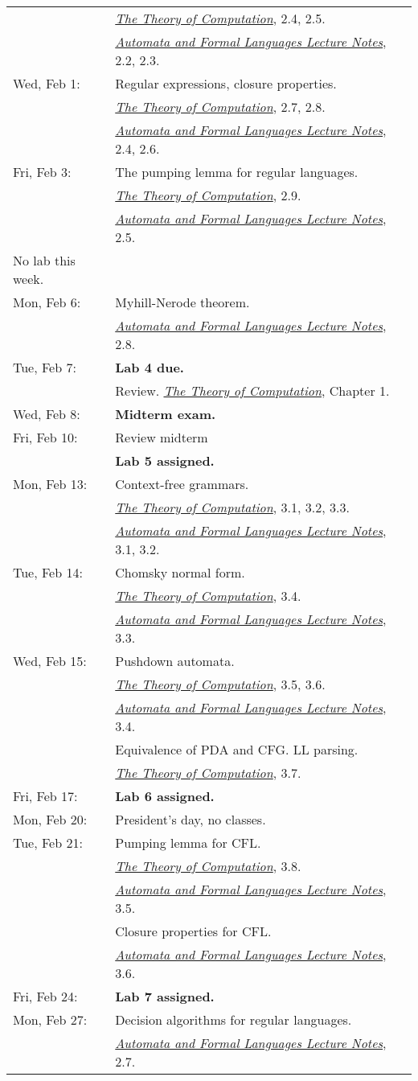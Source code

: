 \documentclass{article}
\newcommand{\theory}
           {\href{http://cg.scs.carleton.ca/~michiel/TheoryOfComputation/}
             {{\em The Theory of Computation}}}
\newcommand{\automata}
           {\href{http://users.utu.fi/jkari/automata/}
             {{\em Automata and Formal Languages Lecture Notes}}}
\begin{document}
\begin{longtable}{ll}
\\&\theory, 2.4, 2.5.
\\&\automata, 2.2, 2.3.
\\
Wed, Feb 1:
& Regular expressions, closure properties.
\\&\theory, 2.7,   2.8.
\\&\automata, 2.4, 2.6.
\\
Fri, Feb 3:
& The pumping lemma for regular languages.
\\&\theory, 2.9.
\\&\automata, 2.5.
\\\hline
No lab this week.
\\
Mon, Feb 6:
& Myhill-Nerode theorem.
\\&\automata, 2.8.
\\
Tue, Feb 7:
& {\bf Lab 4 due.}
\\& Review. \theory, Chapter 1.
\\
Wed, Feb 8:
& {\bf Midterm exam.}
\\
Fri, Feb 10:
& Review midterm
\\& {\bf Lab 5 assigned.}
\\\hline
Mon, Feb 13:
& Context-free grammars.
\\&\theory, 3.1, 3.2, 3.3.
\\&\automata, 3.1,  3.2.
\\
Tue, Feb 14:
& Chomsky normal form.  \\&\theory, 3.4. \\&\automata, 3.3.
\\
Wed, Feb 15:
& Pushdown automata. \\&\theory, 3.5, 3.6.  \\&\automata, 3.4.
\\& Equivalence of PDA and CFG.  LL parsing. \\&\theory, 3.7.
\\
Fri, Feb 17:
& {\bf Lab 6 assigned.}
\\\hline
Mon, Feb 20:&  President's day, no classes.
\\
Tue, Feb 21:
& Pumping lemma for CFL.  \\&\theory, 3.8.  \\&\automata, 3.5.
\\& Closure properties for CFL. \\&\automata, 3.6.
\\
Fri, Feb 24:
& {\bf Lab 7 assigned.}
\\\hline
Mon, Feb 27:
& Decision algorithms for regular languages. \\&\automata, 2.7.

\end{longtable}
\end{document}
